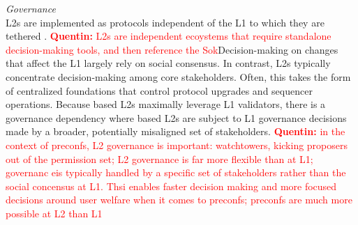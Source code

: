 \documentclass[a4paper]{article}
\theoremstyle{boldstyle}
\newcommand{\qb}[1]{\textcolor{red}{\textbf{Quentin:} #1}}
\begin{document}

    \textit{Governance} \\
    L2s are implemented as protocols independent of the L1 to which they are tethered \cite{SoK_L2s}. \qb{L2s are independent ecoystems that require standalone decision-making tools, and then reference the Sok}Decision-making on changes that affect the L1 largely rely on social consensus. In contrast, L2s typically concentrate decision-making among core stakeholders. Often, this takes the form of centralized foundations that control protocol upgrades and sequencer operations. 
    Because based L2s maximally leverage L1 validators, there is a governance dependency where based L2s are subject to L1 governance decisions made by a broader, potentially misaligned set of stakeholders. 
    \qb{in the context of preconfs, L2 governance is important: watchtowers, kicking proposers out of the permission set; L2 governance is far more flexible than at L1; governanc eis typically handled by a specific set of stakeholders rather than the social concensus at L1. Thsi enables faster decision making and more focused decisions around user welfare when it comes to preconfs; preconfs are much more possible at L2 than L1}

    
\end{document}
